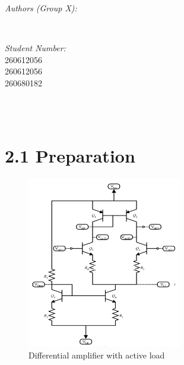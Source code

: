 \documentclass[12pt]{article}
\makeatletter
\let\theauthor\@author
\let\thedate\@date
\makeatother
\begin{document}
\begin{titlepage}
\begin{minipage}{0.4\textwidth}
\begin{flushleft}
            \emph{Authors (Group X):}\\
            \theauthor
            \end{flushleft}
            \end{minipage}~
            \begin{minipage}{0.4\textwidth}
            \begin{flushright} \large
            \emph{Student Number:} \\
            260612056 \\ 260612056 \\ 260680182                                  %
        \end{flushright}
    \end{minipage}\\[2 cm]
 
    {\large \thedate}\\[2 cm]
 
    \vfill
    
\end{titlepage}


\section*{2.1 Preparation}

\begin{figure}[H]
\centering
\includegraphics[width=0.6\textwidth]{op_amp.PNG}
\caption{\label{fig:op-amp} Differential amplifier with active load}
\end{figure}
\end{document}
